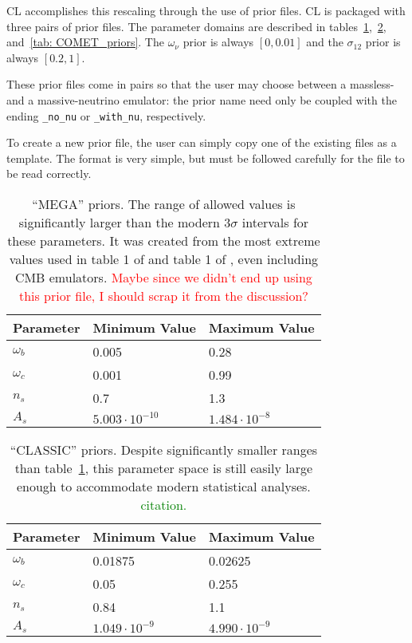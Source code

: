 
CL accomplishes this rescaling through the use of prior files.
CL is packaged with three pairs of prior files. The parameter domains are
described in tables~\ref{tab: MEGA_priors},~\ref{tab: CLASSIC_priors},
and~\ref{tab: COMET_priors}. The $\omega_\nu$ prior is always $[0, 0.01]$ and 
the $\sigma_{12}$ prior is always $[0.2, 1]$.

These prior files come in pairs so that the user may choose between a
massless- and a massive-neutrino emulator: the prior name need only be
coupled with the ending \verb|_no_nu| or \verb|_with_nu|, respectively.

To create a new prior file, the user can simply copy one of the
existing files as a template. The format is very simple, but must be
followed carefully for the file to be read correctly.

\begin{table}[ht!]
\centering
\begin{tabular}{l|l|l}
\hline
Parameter & Minimum Value & Maximum Value \\ \hline
$\omega_b$ & 0.005 & 0.28 \\
$\omega_c$ & 0.001 & 0.99 \\
$n_s$ & 0.7 & 1.3 \\
$A_s$\footnotemark & $5.003 \cdot 10^{-10}$ & $1.484 \cdot 10^{-8}$  \\
\end{tabular}
 \cprotect\caption[``MEGA'' priors]{``MEGA'' priors. The range of allowed
 	values is significantly larger than the modern $3\sigma$ intervals
 	for these parameters. It was created from the most extreme values used
 	in table 1 of \citet{Mancini} and table 1 of \citet{Arico}, even including
 	CMB emulators. 
 	\textcolor{red}{Maybe since we didn't end up using this prior file, I
 	should scrap it from the discussion?}}
 \label{tab: MEGA_priors}
\end{table}

\begin{table}[ht!]
\centering
\begin{tabular}{l|l|l}
\hline
Parameter & Minimum Value & Maximum Value \\ \hline
$\omega_b$ & 0.01875 & 0.02625 \\
$\omega_c$ & 0.05 & 0.255 \\
$n_s$ & 0.84 & 1.1 \\
$A_s$\footnotemark & $1.049 \cdot 10^{-9}$ & $4.990 \cdot 10^{-9}$  \\
\end{tabular}
	\cprotect\caption[``CLASSIC'' priors]{``CLASSIC'' priors. Despite
 	significantly smaller ranges than table~\ref{tab: MEGA_priors}, this
 	parameter space is still easily large enough to accommodate modern
 	statistical analyses. \textcolor{green}{citation.}}
 \label{tab: CLASSIC_priors}
\end{table}

